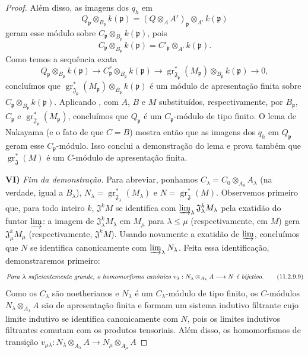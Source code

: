 \begin{proof}
Além disso, as imagens dos $q_h$ em
\[
Q_{\mathfrak p}\otimes_{B_{\mathfrak p}}k(\mathfrak p)
=(Q\otimes_AA')_{\mathfrak p}\otimes_{A'}k(\mathfrak p)
\]
geram esse módulo sobre $C_{\mathfrak p}\otimes_{B_{\mathfrak p}}k(\mathfrak p)$, pois
\[
C_{\mathfrak p}\otimes_{B_{\mathfrak p}}k(\mathfrak p)
=C'_{\mathfrak p}\otimes_{A'}k(\mathfrak p).
\]
Como temos a sequência exata
\[
Q_{\mathfrak p}\otimes_{B_{\mathfrak p}}k(\mathfrak p)
\longrightarrow C_{\mathfrak p}^{r}\otimes_{B_{\mathfrak p}}k(\mathfrak p)
\longrightarrow
\operatorname{gr}_{\mathfrak J_{\mathfrak p}}^*(M_{\mathfrak p})
\otimes_{B_{\mathfrak p}}k(\mathfrak p)\longrightarrow0,
\]
concluímos que $\operatorname{gr}_{\mathfrak J_{\mathfrak p}}^*(M_{\mathfrak p})\otimes_{B_{\mathfrak p}}k(\mathfrak p)$ é um módulo de apresentação finita sobre $C_{\mathfrak p}\otimes_{B_{\mathfrak p}}k(\mathfrak p)$. Aplicando , com $A$, $B$ e $M$ substituídos, respectivamente, por $B_{\mathfrak p}$, $C_{\mathfrak p}$ e $\operatorname{gr}_{\mathfrak J_{\mathfrak p}}^*(M_{\mathfrak p})$, concluímos que $Q_{\mathfrak p}$ é um $C_{\mathfrak p}$-módulo de tipo finito. O lema de Nakayama (e o fato de que $C=B$) mostra então que as imagens dos $q_h$ em $Q_{\mathfrak p}$ geram esse $C_{\mathfrak p}$-módulo. Isso conclui a demonstração do lema  e prova também que $\operatorname{gr}_{\mathfrak J}^*(M)$ é um $C$-módulo de apresentação finita.

\medskip
\noindent\textbf{VI)} \emph{Fim da demonstração.} Para abreviar, ponhamos $C_\lambda=C_0\otimes_{A_0}A_\lambda$ (na verdade, igual a $B_\lambda$), $N_\lambda=\operatorname{gr}_{\mathfrak J_\lambda}^*(M_\lambda)$ e $N=\operatorname{gr}_{\mathfrak J}^*(M)$. Observemos primeiro que, para todo inteiro $k$, $\mathfrak J^kM$ se identifica com $\varinjlim_\lambda\mathfrak J_\lambda^kM_\lambda$ pela exatidão do funtor $\varinjlim$: a imagem de $\mathfrak J_\lambda^kM_\lambda$ em $M_\mu$ para $\lambda\leq\mu$ (respectivamente, em $M$) gera $\mathfrak J_\mu^kM_\mu$ (respectivamente, $\mathfrak J^kM$). Usando novamente a exatidão de $\varinjlim$, concluímos que $N$ se identifica canonicamente com $\varinjlim_\lambda N_\lambda$. Feita essa identificação, demonstraremos primeiro:
\begin{equation}
\text{\emph{Para $\lambda$ suficientemente grande, o homomorfismo canônico
$v_\lambda:N_\lambda\otimes_{A_\lambda}A\to N$ é bijetivo.}}
\label{IV.11.2.9.9}
\tag{11.2.9.9}
\end{equation}
Como os $C_\lambda$ são noetherianos e $N_\lambda$ é um $C_\lambda$-módulo de tipo finito, os $C$-módulos $N_\lambda\otimes_{A_\lambda}A$ são de apresentação finita e formam um sistema indutivo filtrante cujo limite indutivo se identifica canonicamente com $N$, pois os limites indutivos filtrantes comutam com os produtos tensoriais.
Além disso, os homomorfismos de transição
$v_{\mu\lambda}:N_\lambda\otimes_{A_\lambda}A
\to N_\mu\otimes_{A_\mu}A$


\end{proof}
